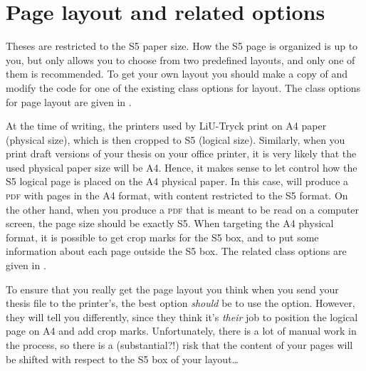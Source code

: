\section{Page layout and related options}\label{sec:page-layout}
%
Theses are restricted to the S5 paper size.  How the S5 page is organized is up to you, but \rtthesis only allows you to choose from two predefined layouts, and only one of them is recommended.  To get your own layout you should make a copy of  and modify the code for one of the existing class options for layout.  The class options for page layout are given in .

At the time of writing, the printers used by LiU-Tryck print on A4 paper (physical size), which is then cropped to S5 (logical size).  Similarly, when you print draft versions of your thesis on your office printer, it is very likely that the used physical paper size will be A4.  Hence, it makes sense to let \rtthesis control how the S5 logical page is placed on the A4 physical paper.  In this case, \rtthesis will produce a \textsc{pdf} with pages in the A4 format, with content restricted to the S5 format.  On the other hand, when you produce a \textsc{pdf} that is meant to be read on a computer screen, the page size should be exactly S5.  When targeting the A4 physical format, it is possible to get crop marks for the S5 box, and to put some information about each page outside the S5 box.  The related class options are given in .

To ensure that you really get the page layout you think when you send your thesis file to the printer's, the best option \emph{should} be to use the  option.  However, they will tell you differently, since they think it's \emph{their} job to position the logical page on A4 and add crop marks.  Unfortunately, there is a lot of manual work in the process, so there is a (substantial?!) risk that the content of your pages will be shifted with respect to the S5 box of your layout\ldots

